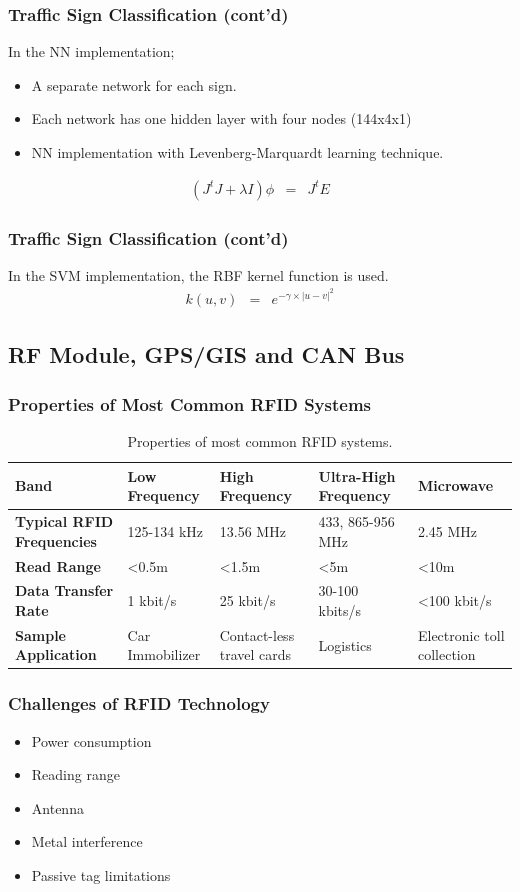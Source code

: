 \documentclass{beamer}
\begin{document}
\frame
{
  \frametitle{Traffic Sign Classification (cont'd)}
  In the NN implementation;
  \begin{itemize}
    \item A separate network for each sign.
 		\item Each network has one hidden layer with four nodes (144x4x1)
  	\item NN implementation with Levenberg-Marquardt learning technique.
  \end{itemize}
	\begin{eqnarray}
	\label{eq9}
		(J^{t}J + \lambda I)\phi &=& J^{t}E
	\end{eqnarray}  
}

\frame
{
  \frametitle{Traffic Sign Classification (cont'd)}
  In the SVM implementation, the RBF kernel function is used.
  \begin{eqnarray}
	\label{eq10}
		k(u,v) &=& e^{-\gamma \times |u-v|^2}
	\end{eqnarray}
}


\subsection{RF Module, GPS/GIS and CAN Bus}
\frame
{
  \frametitle{Properties of Most Common RFID Systems}
  \begin{table}
	\caption{Properties of most common RFID systems.}
	\centering
	{\tiny
	\begin{tabular}{|p{18mm}|p{18mm}|p{18mm}|p{18mm}|p{18mm}|}
	\hline
	{\bf Band} & {\bf Low Frequency} & {\bf High Frequency} & {\bf Ultra-High Frequency} & {\bf Microwave} \\
	\hline
	{\bf Typical RFID Frequencies} & 125-134 kHz &  13.56 MHz & 433, 865-956 MHz &   2.45 MHz \\
	\hline
	{\bf Read Range} &     \textless 0.5m &     \textless 1.5m &       \textless 5m &      \textless 10m \\
	\hline
	{\bf Data Transfer Rate} &   1 kbit/s &  25 kbit/s & 30-100 kbits/s & \textless 100 kbit/s \\
	\hline
	{\bf Sample Application} & Car Immobilizer & Contact-less travel cards &  Logistics & Electronic toll collection \\
	\hline
	\end{tabular} 
	}
	\label{tab:rfid1}
	\end{table}
}

\frame
{
  \frametitle{Challenges of RFID Technology}
	\begin{itemize}
		\item Power consumption
		\item Reading range
		\item Antenna
		\item Metal interference
		\item Passive tag limitations
	\end{itemize}	
}
\end{document}
